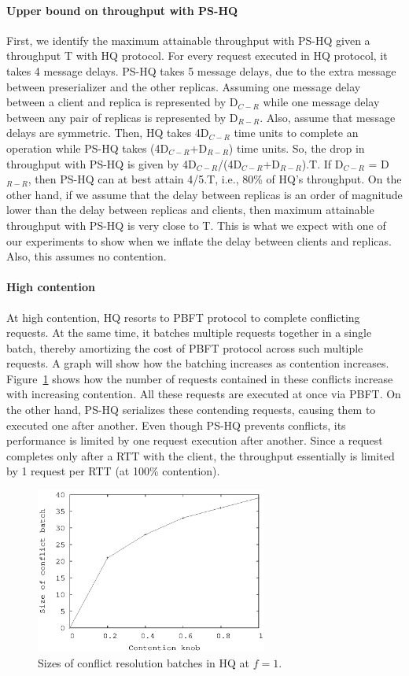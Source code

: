 \documentclass[twocolumn,10pt]{article}
\begin{document}
\paragraph{Upper bound on throughput with PS-HQ} First, we identify the maximum attainable throughput
with PS-HQ given a throughput T with HQ protocol. For every request executed in HQ protocol, it takes
4 message delays. PS-HQ takes 5 message delays, due to the extra message between preserializer and
the other replicas. Assuming one message delay between a client and replica is represented by D$_{C-R}$
while one message delay between any pair of replicas is represented by D$_{R-R}$. Also, assume that 
message delays are symmetric. Then, HQ takes 4D$_{C-R}$ time units to complete an operation while PS-HQ
takes (4D$_{C-R}$+D$_{R-R}$) time units.  So, the drop in throughput with PS-HQ is given
by 4D$_{C-R}$/(4D$_{C-R}$+D$_{R-R}$).T. If D$_{C-R}$ = D$_{R-R}$, then PS-HQ can at best attain 4/5.T,
i.e., 80\% of HQ's throughput. On the other hand, if we assume that the delay between replicas 
is an order of
magnitude lower than the delay between replicas and clients, then
maximum attainable throughput with PS-HQ is very close to T. This is what we expect with one of our
experiments to show when we inflate the delay between clients and replicas. Also, this assumes no
contention.


\paragraph{High contention} At high contention, HQ resorts to PBFT protocol to complete
conflicting requests. At the same time, it batches multiple requests together in a single
batch, thereby amortizing the cost of PBFT protocol across such multiple requests. A graph
will show how the batching increases as contention increases. Figure~\ref{fig:hq-conflict-batch-f-1}
shows how the number of requests contained in these conflicts increase with increasing contention.
All these requests are executed at once via PBFT.
On the other hand, PS-HQ serializes these contending requests,
causing them to executed one after another. Even though PS-HQ prevents conflicts, its performance
is limited by one request execution after another. Since a request completes only after a RTT with
the client, the throughput essentially is limited by 1 request per RTT (at 100\% contention).

\begin{figure}
\centering
\includegraphics[width=3.0in]{temp-Figures/hq-contention-batch-f-1.ps}
\caption{Sizes of conflict resolution batches in HQ
at $f=1$.}
\label{fig:hq-conflict-batch-f-1}
\end{figure}
\end{document}
